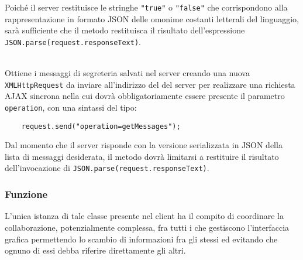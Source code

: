 \begin{description}
  Poiché il server restituisce le stringhe \verb'"true"' o \verb'"false"' che corrispondono alla rappresentazione in formato JSON delle omonime costanti letterali del linguaggio, sarà sufficiente che il metodo restituisca il risultato dell'espressione \verb'JSON.parse(request.responseText)'.
  
    \item{}\\
  Ottiene i messaggi di segreteria salvati nel server creando una nuova \verb'XMLHttpRequest' da inviare all'indirizzo del  del server per realizzare una richiesta AJAX sincrona nella cui  dovrà obbligatoriamente essere presente il parametro \verb'operation', con una sintassi del tipo:
  \begin{verbatim}
    request.send("operation=getMessages");
  \end{verbatim}
  
  Dal momento che il server risponde con la versione serializzata in JSON della lista di messaggi desiderata, il metodo dovrà limitarsi a restituire il risultato dell'invocazione di \verb'JSON.parse(request.responseText)'.
  
\end{description}



\subsubsection*{Funzione}
L'unica istanza di tale classe presente nel client ha il compito di coordinare la collaborazione, potenzialmente complessa, fra tutti i  che gestiscono l'interfaccia grafica permettendo lo scambio di informazioni fra gli stessi ed evitando che ognuno di essi debba riferire direttamente gli altri.

